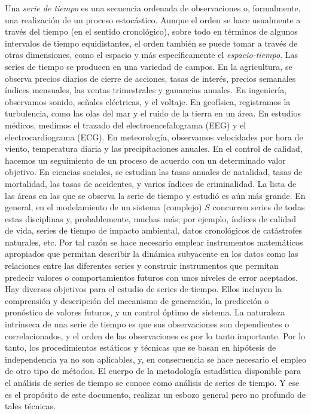 Una \textit{serie de tiempo} es una secuencia ordenada de observaciones o, formalmente, una realización de
un proceso estocástico. Aunque el orden se hace usualmente a través del tiempo (en el sentido
cronológico), sobre todo en términos de algunos intervalos de tiempo equidistantes, el orden
también se puede tomar a través de otras dimensiones, como el espacio y más específicamente el
\textit{espacio-tiempo}. Las series de tiempo se producen en una variedad de campos. En la agricultura, se
observa precios diarios de cierre de acciones, tasas de interés, precios semanales índices mensuales,
las ventas trimestrales y ganancias anuales. En ingeniería, observamos sonido, señales eléctricas, y
el voltaje. En geofísica, registramos la turbulencia, como las olas del mar y el ruido de la tierra en un
área. En estudios médicos, medimos el trazado del electroencefalograma (EEG) y el
electrocardiograma (ECG). En meteorología, observamos velocidades por hora de viento,
temperatura diaria y las precipitaciones anuales. En el control de calidad, hacemos un seguimiento
de un proceso de acuerdo con un determinado valor objetivo. En ciencias sociales, se estudian las tasas anuales de natalidad, tasas de mortalidad, las tasas de accidentes, y varios índices de
criminalidad. La lista de las áreas en las que se observa la serie de tiempo y estudió es aún más
grande. En general, en el modelamiento de un sistema (complejo) $S$ concurren series de todas estas
disciplinas y, probablemente, muchas más; por ejemplo, índices de calidad de vida, series de tiempo
de impacto ambiental, datos cronológicos de catástrofes naturales, etc. Por tal razón se hace
necesario emplear instrumentos matemáticos apropiados que permitan describir la dinámica
subyacente en los datos como las relaciones entre las diferentes series y construir instrumentos que
permitan predecir valores o comportamientos futuros con unos niveles de error aceptados.\\


Hay diversos objetivos para el estudio de series de tiempo. Ellos incluyen la comprensión y
descripción del mecanismo de generación, la predicción o pronóstico de valores futuros, y un
control óptimo de sistema. La naturaleza intrínseca de una serie de tiempo es que sus observaciones
son dependientes o correlacionados, y el orden de las observaciones es por lo tanto importante. Por
lo tanto, los procedimientos estáticos y técnicas que se basan en hipótesis de independencia ya no
son aplicables, y, en consecuencia se hace necesario el empleo de otro tipo de métodos. El cuerpo de
la metodología estadística disponible para el análisis de series de tiempo se conoce como análisis de
series de tiempo. Y ese es el propósito de este documento, realizar un esbozo general pero no
profundo de tales técnicas.\\


